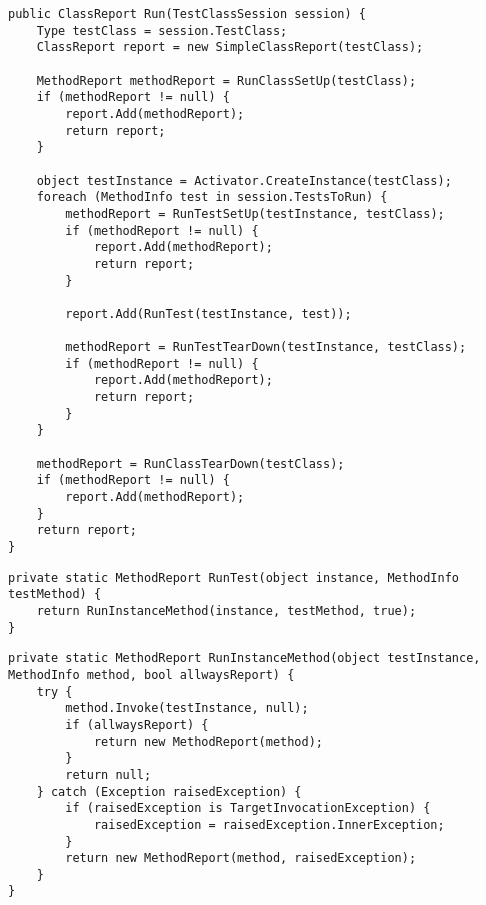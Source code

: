 \begin{lstlisting}[caption={[Quellcode der \textit{Run}-Methode von \textit{SimpleTestRunner}]Quellcode der \textit{Run}-Methode von \textit{SimpleTestRunner}}, label=code:SimpleTestRunner_Run]
public ClassReport Run(TestClassSession session) {
    Type testClass = session.TestClass;
    ClassReport report = new SimpleClassReport(testClass);

    MethodReport methodReport = RunClassSetUp(testClass);
    if (methodReport != null) {
        report.Add(methodReport);
        return report;
    }

    object testInstance = Activator.CreateInstance(testClass);
    foreach (MethodInfo test in session.TestsToRun) {
        methodReport = RunTestSetUp(testInstance, testClass);
        if (methodReport != null) {
            report.Add(methodReport);
            return report;
        }

        report.Add(RunTest(testInstance, test));

        methodReport = RunTestTearDown(testInstance, testClass);
        if (methodReport != null) {
            report.Add(methodReport);
            return report;
        }
    }

    methodReport = RunClassTearDown(testClass);
    if (methodReport != null) {
        report.Add(methodReport);
    }
    return report;
}
\end{lstlisting}

\begin{lstlisting}[caption={[Quellcode der \textit{RunTest}-Methode von \textit{SimpleTestRunner}]Quellcode der \textit{RunTest}-Methode von \textit{SimpleTestRunner}}, label=code:SimpleTestRunner_RunTest]
private static MethodReport RunTest(object instance, MethodInfo testMethod) {
    return RunInstanceMethod(instance, testMethod, true);
}
\end{lstlisting}

\begin{lstlisting}[caption={[Quellcode der \textit{RunInstanceMethod}-Methode von \textit{SimpleTestRunner}]Quellcode der \textit{\textbf{RunTest}}-Methode von \textit{SimpleTestRunner}}, label=code:SimpleTestRunner_RunInstanceMethod]
private static MethodReport RunInstanceMethod(object testInstance, MethodInfo method, bool allwaysReport) {
    try {
        method.Invoke(testInstance, null);
        if (allwaysReport) {
            return new MethodReport(method);
        }
        return null;
    } catch (Exception raisedException) {
        if (raisedException is TargetInvocationException) {
            raisedException = raisedException.InnerException;
        }
        return new MethodReport(method, raisedException);
    }
}
\end{lstlisting}

